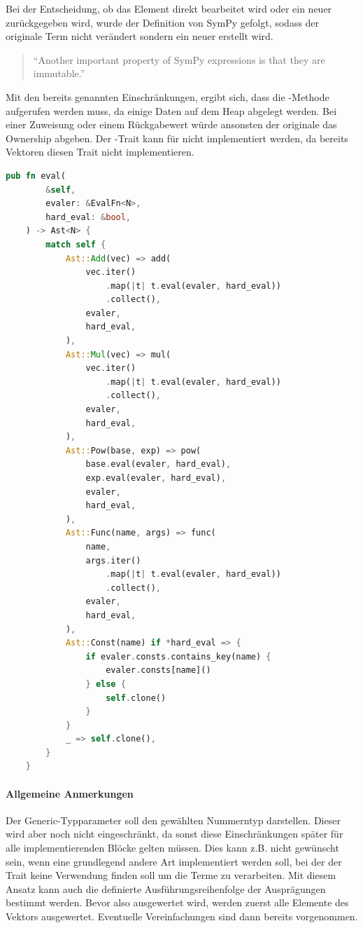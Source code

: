 \documentclass[11pt,a4paper, ngerman]{article}
\begin{document}
Bei der Entscheidung, ob das Element direkt bearbeitet wird oder ein neuer  zurückgegeben wird, wurde der Definition von SymPy gefolgt, sodass der originale Term nicht verändert sondern ein neuer erstellt wird.

\begin{quote}
    ``Another important property of SymPy expressions is that they are immutable.'' \cite[S. 19]{SympyPeerJ}
\end{quote}

Mit den bereits genannten Einschränkungen, ergibt sich, dass die -Methode aufgerufen werden muss, da einige Daten auf dem Heap abgelegt werden. Bei einer Zuweisung oder einem Rückgabewert würde ansonsten der originale  das Ownership abgeben. Der -Trait kann für  nicht implementiert werden, da bereits Vektoren diesen Trait nicht implementieren.

\begin{lstlisting}[language=rust, caption={eval-Methode 1. Implementierung}]
    pub fn eval(
        &self,
        evaler: &EvalFn<N>,
        hard_eval: &bool,
    ) -> Ast<N> {
        match self {
            Ast::Add(vec) => add(
                vec.iter()
                    .map(|t| t.eval(evaler, hard_eval))
                    .collect(),
                evaler,
                hard_eval,
            ),
            Ast::Mul(vec) => mul(
                vec.iter()
                    .map(|t| t.eval(evaler, hard_eval))
                    .collect(),
                evaler,
                hard_eval,
            ),
            Ast::Pow(base, exp) => pow(
                base.eval(evaler, hard_eval),
                exp.eval(evaler, hard_eval),
                evaler,
                hard_eval,
            ),
            Ast::Func(name, args) => func(
                name,
                args.iter()
                    .map(|t| t.eval(evaler, hard_eval))
                    .collect(),
                evaler,
                hard_eval,
            ),
            Ast::Const(name) if *hard_eval => {
                if evaler.consts.contains_key(name) {
                    evaler.consts[name]()
                } else {
                    self.clone()
                }
            }
            _ => self.clone(),
        }
    }
\end{lstlisting}

\paragraph{Allgemeine Anmerkungen} Der Generic-Typparameter  soll den gewählten Nummerntyp darstellen. Dieser wird aber noch nicht eingeschränkt, da sonst diese Einschränkungen später für alle implementierenden Blöcke gelten müssen. Dies kann z.B. nicht gewünscht sein, wenn eine grundlegend andere Art implementiert werden soll, bei der der Trait  keine Verwendung finden soll um die Terme zu verarbeiten. Mit diesem Ansatz kann auch die definierte Ausführungsreihenfolge der Ausprägungen bestimmt werden. Bevor also  ausgewertet wird, werden zuerst alle Elemente des Vektors ausgewertet. Eventuelle Vereinfachungen sind dann bereits vorgenommen.
\end{document}
